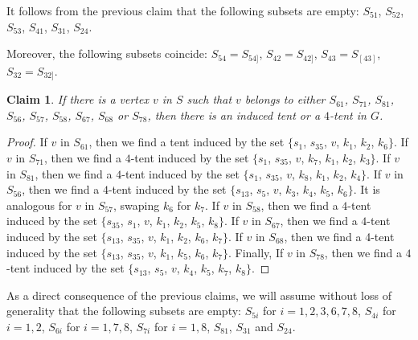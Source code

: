 \documentclass[12pt]{book}
\theoremstyle{plain}
\newtheorem{claim}[teo]{Claim}
\theoremstyle{remark}
\begin{document}
It follows from the previous claim that the following subsets are empty:
$S_{51}$, $S_{52}$, $S_{53}$, $S_{41}$, $S_{31}$, $S_{24}$.

Moreover, the following subsets coincide:
$S_{54} = S_{54]}$, $S_{42} = S_{42]}$, $S_{43} = S_{[43]}$, $S_{32} = S_{32]}$.

\begin{claim} \label{claim:co4tent_1} %
	If there is a vertex $v$ in $S$ such that $v$ belongs to either $S_{61}$, $S_{71}$, $S_{81}$, $S_{56}$, $S_{57}$, $S_{58}$, $S_{67}$, $S_{68}$ or $S_{78}$, then there is an induced tent or a $4$-tent in $G$.
\end{claim} 
\begin{proof}
	If $v$ in $S_{61}$, then we find a tent induced by the set $\{s_{1}$, $s_{35}$, $v$, $k_1$, $k_2$, $k_6\}$. If $v$ in $S_{71}$, then we find a $4$-tent induced by the set $\{s_{1}$, $s_{35}$, $v$, $k_7$, $k_1$, $k_2$, $k_3\}$. If $v$ in $S_{81}$, then we find a $4$-tent induced by the set $\{s_{1}$, $s_{35}$, $v$, $k_8$, $k_1$, $k_2$, $k_4\}$.  
If $v$ in $S_{56}$, then we find a $4$-tent induced by the set $\{s_{13}$, $s_{5}$, $v$, $k_3$, $k_4$, $k_5$, $k_6\}$. It is analogous for $v$ in $S_{57}$, swaping $k_6$ for $k_7$. If $v$ in $S_{58}$, then we find a $4$-tent induced by the set $\{s_{35}$, $s_{1}$, $v$, $k_1$, $k_2$, $k_5$, $k_8\}$.
If $v$ in $S_{67}$, then we find a $4$-tent induced by the set $\{s_{13}$, $s_{35}$, $v$, $k_1$, $k_2$, $k_6$, $k_7\}$. If $v$ in $S_{68}$, then we find a 4-tent induced by the set $\{s_{13}$, $s_{35}$, $v$, $k_1$, $k_5$, $k_6$, $k_7\}$. Finally, If $v$ in $S_{78}$, then we find a $4$-tent induced by the set $\{s_{13}$, $s_{5}$, $v$, $k_4$, $k_5$, $k_7$, $k_8\}$. 
\end{proof}

\vspace{1mm}
As a direct consequence of the previous claims, we will assume without loss of generality that the following subsets are empty:
$S_{5i}$ for $i=1, 2, 3, 6, 7, 8$, $S_{4i}$ for $i=1, 2$, $S_{6i}$ for $i=1, 7, 8$, $S_{7i}$ for $i=1, 8$, $S_{81}$, $S_{31}$ and $S_{24}$.
\end{document}
